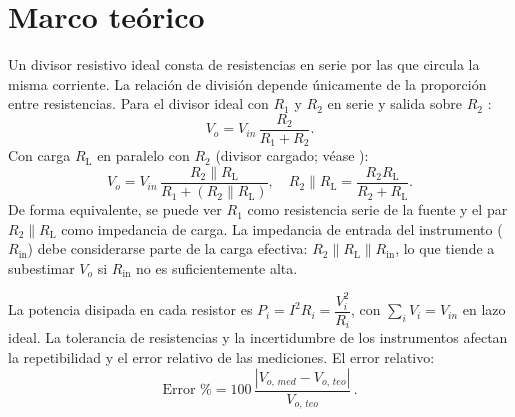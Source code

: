 \documentclass[conference]{IEEEtran}
\begin{document}
\section{Marco teórico}
Un divisor resistivo ideal consta de resistencias en serie por las que circula la misma corriente. La relación de división depende únicamente de la proporción entre resistencias.
Para el divisor ideal con $R_1$ y $R_2$ en serie y salida sobre $R_2$ \cite{ref:khan}:
\begin{equation}
  V_{o} = V_{in}\,\frac{R_2}{R_1 + R_2}.
\end{equation}
Con carga $R_\mathrm{L}$ en paralelo con $R_2$ (divisor cargado; véase \cite{ref:khan}):
\begin{equation}
  V_{o} = V_{in}\,\frac{R_2\parallel R_\mathrm{L}}{R_1 + (R_2\parallel R_\mathrm{L})},\quad R_2\parallel R_\mathrm{L}=\frac{R_2 R_\mathrm{L}}{R_2+R_\mathrm{L}}.
\end{equation}
De forma equivalente, se puede ver $R_1$ como resistencia serie de la fuente y el par $R_2\parallel R_\mathrm{L}$ como impedancia de carga. La impedancia de entrada del instrumento ($R_\mathrm{in}$) debe considerarse parte de la carga efectiva: $R_2\parallel R_\mathrm{L}\parallel R_\mathrm{in}$, lo que tiende a subestimar $V_o$ si $R_\mathrm{in}$ no es suficientemente alta.

La potencia disipada en cada resistor es $P_i=I^2R_i=\dfrac{V_i^2}{R_i}$, con $\sum_i V_i=V_{in}$ en lazo ideal. La tolerancia de resistencias y la incertidumbre de los instrumentos afectan la repetibilidad y el error relativo de las mediciones.
El error relativo:
\begin{equation}
  \text{Error \%} = 100\,\frac{|V_{o,\,med} - V_{o,\,teo}|}{V_{o,\,teo}}\, .
\end{equation}
\end{document}
